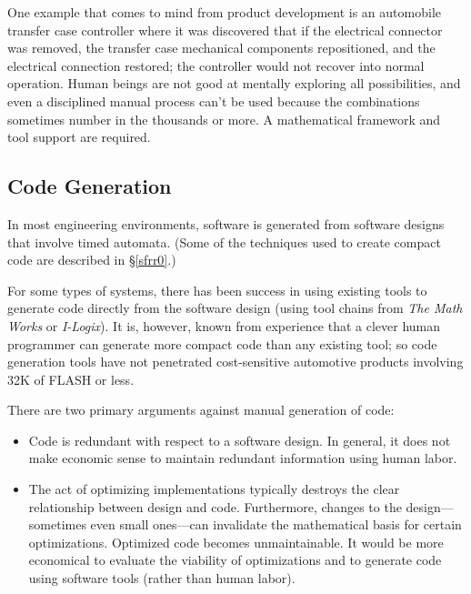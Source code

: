 \documentclass[letterpaper,10pt,titlepage]{article}
\begin{document}
One example that comes to mind from product development is an automobile transfer case controller
where it was discovered that if the electrical connector was removed, the transfer case mechanical
components repositioned, and the electrical connection restored; the controller would not
recover into normal operation.  Human beings are not good at mentally exploring all possibilities, and even
a disciplined manual process can't be used because the combinations sometimes number in the thousands
or more.  A mathematical framework and tool support are required.



\subsection{Code Generation}
\label{staf0:scgn0}

In most engineering environments, software is generated
from software designs that involve timed automata.  (Some of the techniques
used to create compact code are described in \S{}\ref{sfrr0}.)

For some types of systems, there has been success in using
existing tools to generate code directly from the software design
(using tool chains from \emph{The Math Works} or \emph{I-Logix}).  It is,
however, known from experience that a clever human programmer can generate
more compact code than any existing tool; so code generation tools have
not penetrated cost-sensitive automotive products involving 32K of FLASH or less.

There are two primary arguments against manual generation of code:

\begin{itemize}
\item Code is redundant with respect to a software design.
      In general, it does not make economic sense to maintain redundant
      information using human labor.
\item The act of optimizing implementations typically destroys the
      clear relationship between design and code.  Furthermore, changes
      to the design---sometimes even small ones---can invalidate the
      mathematical basis for certain optimizations.  Optimized code becomes
      unmaintainable.  It would be more economical to evaluate the viability 
      of optimizations and to generate code using software tools (rather than
      human labor).
\end{itemize}
\end{document}
